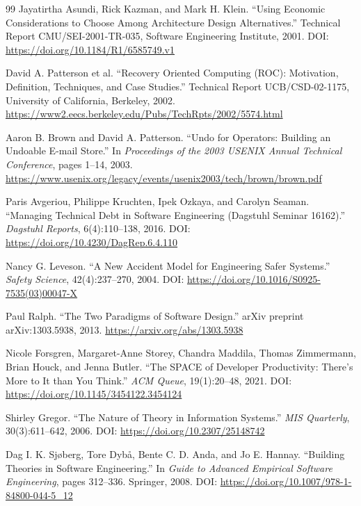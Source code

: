 \documentclass[11pt,a4paper]{ctexart}
\numberwithin{equation}{section}
\theoremstyle{definition}
\theoremstyle{plain}
\begin{document}
\begin{thebibliography}{99}
Jayatirtha Asundi, Rick Kazman, and Mark H. Klein.
\newblock ``Using Economic Considerations to Choose Among Architecture Design Alternatives.''
\newblock Technical Report CMU/SEI-2001-TR-035, Software Engineering Institute, 2001.
\newblock DOI: \url{https://doi.org/10.1184/R1/6585749.v1}

David A. Patterson et al.
\newblock ``Recovery Oriented Computing (ROC): Motivation, Definition, Techniques, and Case Studies.''
\newblock Technical Report UCB/CSD-02-1175, University of California, Berkeley, 2002.
\newblock \url{https://www2.eecs.berkeley.edu/Pubs/TechRpts/2002/5574.html}

Aaron B. Brown and David A. Patterson.
\newblock ``Undo for Operators: Building an Undoable E-mail Store.''
\newblock In \textit{Proceedings of the 2003 USENIX Annual Technical Conference}, pages 1--14, 2003.
\newblock \url{https://www.usenix.org/legacy/events/usenix2003/tech/brown/brown.pdf}

Paris Avgeriou, Philippe Kruchten, Ipek Ozkaya, and Carolyn Seaman.
\newblock ``Managing Technical Debt in Software Engineering (Dagstuhl Seminar 16162).''
\newblock \textit{Dagstuhl Reports}, 6(4):110--138, 2016.
\newblock DOI: \url{https://doi.org/10.4230/DagRep.6.4.110}

Nancy G. Leveson.
\newblock ``A New Accident Model for Engineering Safer Systems.''
\newblock \textit{Safety Science}, 42(4):237--270, 2004.
\newblock DOI: \url{https://doi.org/10.1016/S0925-7535(03)00047-X}

Paul Ralph.
\newblock ``The Two Paradigms of Software Design.''
\newblock arXiv preprint arXiv:1303.5938, 2013.
\newblock \url{https://arxiv.org/abs/1303.5938}

Nicole Forsgren, Margaret-Anne Storey, Chandra Maddila, Thomas Zimmermann, Brian Houck, and Jenna Butler.
\newblock ``The SPACE of Developer Productivity: There's More to It than You Think.''
\newblock \textit{ACM Queue}, 19(1):20--48, 2021.
\newblock DOI: \url{https://doi.org/10.1145/3454122.3454124}

Shirley Gregor.
\newblock ``The Nature of Theory in Information Systems.''
\newblock \textit{MIS Quarterly}, 30(3):611--642, 2006.
\newblock DOI: \url{https://doi.org/10.2307/25148742}

Dag I. K. Sjøberg, Tore Dybå, Bente C. D. Anda, and Jo E. Hannay.
\newblock ``Building Theories in Software Engineering.''
\newblock In \textit{Guide to Advanced Empirical Software Engineering}, pages 312--336. Springer, 2008.
\newblock DOI: \url{https://doi.org/10.1007/978-1-84800-044-5_12}


\end{thebibliography}
\end{document}
